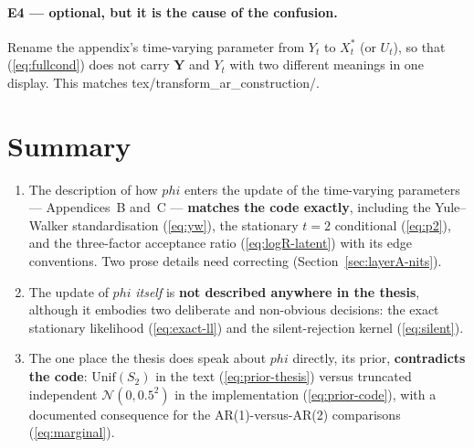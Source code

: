 \documentclass[11pt]{article}
\newcommand{\bphi}{\boldsymbol{\varphi}}
\newcommand{\bY}{\mathbf{Y}}
\newcommand{\Norm}{\mathcal{N}}
\newcommand{\Unif}{\mathrm{Unif}}
\DeclareRobustCommand{\code}[1]{\texttt{#1}}
\newcommand{\eref}[1]{(\ref{#1})}
\newcommand{\sref}[1]{Section~\ref{#1}}
\def\bphi{phi}%
\def\boldsymbol#1{#1}%
\def\code#1{#1}%
\theoremstyle{plain}
\theoremstyle{definition}
\theoremstyle{remark}
\begin{document}
\paragraph{E4 --- optional, but it is the cause of the confusion.}
Rename the appendix's time-varying parameter from $Y_t$ to $X^{*}_t$ (or
$U_t$), so that \eref{eq:fullcond} does not carry $\bY$ and $Y_t$ with two
different meanings in one display. This matches
\code{tex/transform\_ar\_construction/}.

\section{Summary}

\begin{enumerate}[label=\textbf{(\Alph*)}, leftmargin=*]
\item The description of how $\bphi$ enters the update of the time-varying
      parameters --- Appendices~B and~C --- \textbf{matches the code exactly},
      including the Yule--Walker standardisation \eref{eq:yw}, the stationary
      $t = 2$ conditional \eref{eq:p2}, and the three-factor acceptance ratio
      \eref{eq:logR-latent} with its edge conventions. Two prose details need
      correcting (\sref{sec:layerA-nits}).
\item The update of $\bphi$ \emph{itself} is \textbf{not described anywhere in
      the thesis}, although it embodies two deliberate and non-obvious
      decisions: the exact stationary likelihood \eref{eq:exact-ll} and the
      silent-rejection kernel \eref{eq:silent}.
\item The one place the thesis does speak about $\bphi$ directly, its prior,
      \textbf{contradicts the code}: $\Unif(S_2)$ in the text
      \eref{eq:prior-thesis} versus truncated independent $\Norm(0, 0.5^2)$ in
      the implementation \eref{eq:prior-code}, with a documented consequence
      for the AR(1)-versus-AR(2) comparisons \eref{eq:marginal}.
\end{enumerate}
\end{document}
